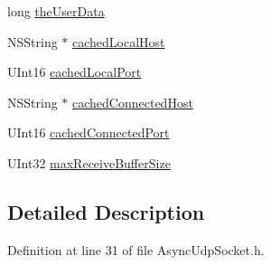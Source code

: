 \begin{DoxyCompactItemize}
long \hyperlink{interface_async_udp_socket_af6dc350be3ed36a9ea2bd10580c263d2}{theUserData}
\item 
NSString $\ast$ \hyperlink{interface_async_udp_socket_a70121d5428f91a258f4daf681ee9de1c}{cachedLocalHost}
\item 
UInt16 \hyperlink{interface_async_udp_socket_af32f75b7bb7fa8921e37120cc76696da}{cachedLocalPort}
\item 
NSString $\ast$ \hyperlink{interface_async_udp_socket_a19b1f11e0f8df8553b680877639f7cd7}{cachedConnectedHost}
\item 
UInt16 \hyperlink{interface_async_udp_socket_ac6c5eb2925f6c9df21a9a29c0fe2b691}{cachedConnectedPort}
\item 
UInt32 \hyperlink{interface_async_udp_socket_ace077d3152576d63382d195442476f61}{maxReceiveBufferSize}
\end{DoxyCompactItemize}


\subsection{Detailed Description}


Definition at line 31 of file AsyncUdpSocket.h.



